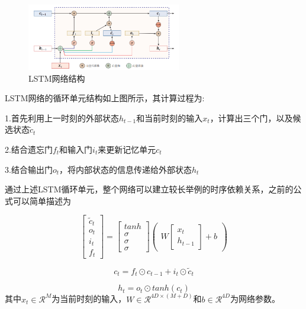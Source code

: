 \documentclass{article}
\begin{document}
\begin{figure}[H]
    \centering
    \includegraphics[width=0.6\textwidth]{figures/LSTM.png}
    \caption{LSTM网络结构}
\end{figure}


LSTM网络的循环单元结构如上图所示\cite{qiu2020nndl}，其计算过程为:\par
1.首先利用上一时刻的外部状态$h_{t-1}$和当前时刻的输入$x_{t}$，计算出三个门，以及候选状态$\widetilde{c}_{t}$  \par
2.结合遗忘门$f_{t}$和输入门$i_{t}$来更新记忆单元$c_{t}$\par
3.结合输出门$o_{t}$，将内部状态的信息传递给外部状态$h_{t}$\par



通过上述LSTM循环单元，整个网络可以建立较长举例的时序依赖关系，之前的公式可以简单描述为\par

$$
    \begin{bmatrix} \widetilde{c}_{t} \\ o_{t} \\ i_{t} \\ f_{t} \end{bmatrix} = \begin{bmatrix} tanh \\ \sigma \\ \sigma \\ \sigma \end{bmatrix} \begin{pmatrix} W \begin{bmatrix} x_{t} \\ h_{t-1} \end{bmatrix} + b \end{pmatrix}
$$

$$c_{t}=f_{t}{\odot}c_{t-1}+i_{t}{\odot}{\widetilde{c}_{t}}$$

$$h_{t}=o_{t}{\odot}tanh(c_{t})$$
其中$x_{t}{\in}\mathcal{R}^{M}$为当前时刻的输入，$W{\in}\mathcal{R}^{4D{\times}(M+D)}$和$b{\in}{\mathcal{R}^{4D}}$为网络参数。  \par
\end{document}
